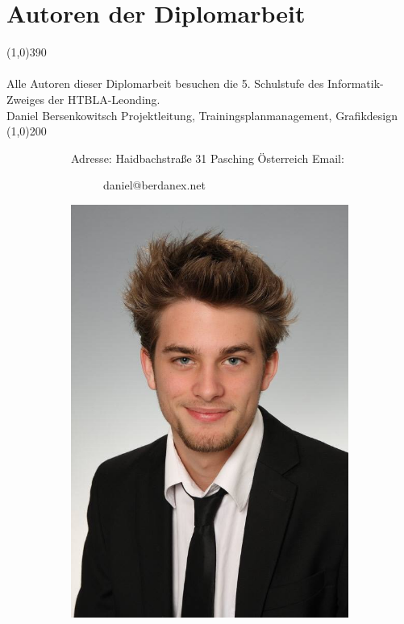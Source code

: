 \documentclass[FIPLY_base.tex]{subfiles}
\begin{document}
	\section{Autoren der Diplomarbeit}
	\line(1,0){390}
	\ \\
	\ \\
	Alle Autoren dieser Diplomarbeit besuchen die 5. Schulstufe des Informatik-Zweiges der HTBLA-Leonding.
	\ \\
	\newline\newline
	{\Large Daniel Bersenkowitsch} \newline
	Projektleitung, Trainingsplanmanagement, Grafikdesign
	\ \\
	\line(1,0){200}
	\begin{figure}[H]
		\begin{subfigure}[b]{0.3\textwidth}
			Adresse: \newline
			Haidbachstraße 31  Pasching \newline
			Österreich \newline
			\newline
			Email:
			\begin{subfigure}[b]{0.2\textwidth}
				daniel@berdanex.net
			\end{subfigure}
		\end{subfigure}
		\hfil
		\begin{subfigure}[b]{0.2\textwidth}
			\includegraphics[scale=0.1]{img/dani}

\end{subfigure}
\end{figure}
\end{document}
